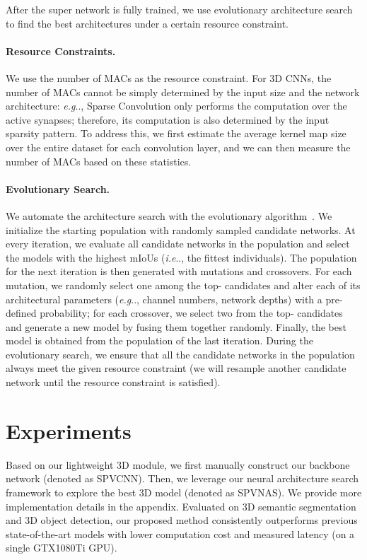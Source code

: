 \documentclass[runningheads]{llncs}
\makeatletter
\DeclareRobustCommand\onedot{\futurelet\@let@token\@onedot}
\def\@onedot{\ifx\@let@token.\else.\null\fi\xspace}
\def\eg{\emph{e.g}\onedot} \def\Eg{\emph{E.g}\onedot}
\def\ie{\emph{i.e}\onedot} \def\Ie{\emph{I.e}\onedot}
\def\cnnshort{SPVCNN\xspace}
\def\modelshort{SPVNAS\xspace}
\makeatother
\begin{document}
After the super network is fully trained, we use evolutionary architecture search to find the best architectures under a certain resource constraint.

\paragraph{Resource Constraints.}

We use the number of MACs as the resource constraint. For 3D CNNs, the number of MACs cannot be simply determined by the input size and the network architecture: \eg, Sparse Convolution only performs the computation over the active synapses; therefore, its computation is also determined by the input sparsity pattern. To address this, we first estimate the average kernel map size over the entire dataset for each convolution layer, and we can then measure the number of MACs based on these statistics.

\paragraph{Evolutionary Search.}

We automate the architecture search with the evolutionary algorithm~\cite{guo2019single}. We initialize the starting population with  randomly sampled candidate networks. At every iteration, we evaluate all candidate networks in the population and select the  models with the highest mIoUs (\ie, the fittest individuals). The population for the next iteration is then generated with  mutations and  crossovers. For each mutation, we randomly select one among the top- candidates and alter each of its architectural parameters (\eg, channel numbers, network depths) with a pre-defined probability; for each crossover, we select two from the top- candidates and generate a new model by fusing them together randomly. Finally, the best model is obtained from the population of the last iteration. During the evolutionary search, we ensure that all the candidate networks in the population always meet the given resource constraint (we will resample another candidate network until the resource constraint is satisfied). \section{Experiments}

Based on our lightweight 3D module, we first manually construct our backbone network (denoted as \cnnshort). Then, we leverage our neural architecture search framework to explore the best 3D model (denoted as \modelshort). We provide more implementation details in the appendix. Evaluated on 3D semantic segmentation and 3D object detection, our proposed method consistently outperforms previous state-of-the-art models with lower computation cost and measured latency (on a single GTX1080Ti GPU).
\end{document}
